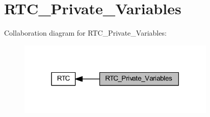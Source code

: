 \hypertarget{group___r_t_c___private___variables}{}\section{R\+T\+C\+\_\+\+Private\+\_\+\+Variables}
\label{group___r_t_c___private___variables}
Collaboration diagram for R\+T\+C\+\_\+\+Private\+\_\+\+Variables\+:
\nopagebreak
\begin{figure}[H]
\begin{center}
\leavevmode
\includegraphics[width=267pt]{group___r_t_c___private___variables}
\end{center}
\end{figure}
